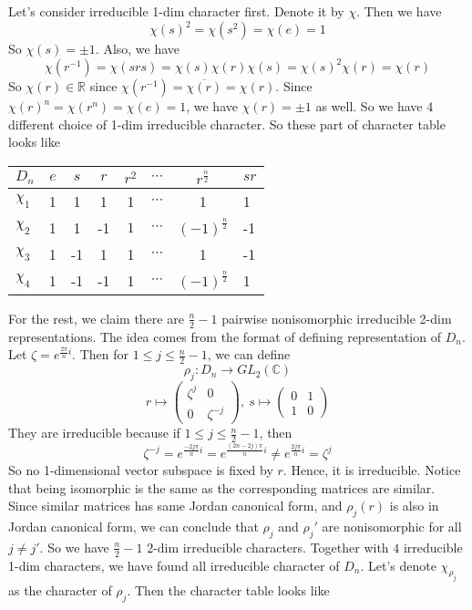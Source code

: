 \documentclass[12pt]{amsart}
\newcommand{\R}{\mathbb{R}}
\newcommand{\C}{\mathbb{C}}
\begin{document}
Let's consider irreducible 1-dim character first. Denote it by $\chi$. Then we have
\[\chi(s)^2=\chi(s^2)=\chi(e)=1\]
So $\chi(s)=\pm 1$. Also, we have
\[\chi(r^{-1})=\chi(srs)=\chi(s)\chi(r)\chi(s)=\chi(s)^2\chi(r)=\chi(r)\]
So $\chi(r)\in\R$ since $\chi(r^{-1})=\overline{\chi(r)}=\chi(r)$. Since $\chi(r)^n=\chi(r^n)=\chi(e)=1$, we have $\chi(r)=\pm 1$ as well. So we have 4 different choice of 1-dim irreducible character. So these part of character table looks like
\begin{table}[H]
    \centering
    \begin{tabular}{l|ccccccl}
        $D_n$    & $e$ & $s$ & $r$ & $r^2$ & $\cdots$ & $r^\frac{n}{2}$    & $sr$ \\ \hline
        $\chi_1$ & 1   & 1   & 1   & 1     & $\cdots$ & 1                  & 1    \\
        $\chi_2$ & 1   & 1   & -1  & $1$   & $\cdots$ & $(-1)^\frac{n}{2}$ & -1   \\
        $\chi_3$ & 1   & -1  & 1   & 1     & $\cdots$ & 1                  & -1   \\
        $\chi_4$ & 1   & -1  & -1  & 1     & $\cdots$ & $(-1)^\frac{n}{2}$ & 1
    \end{tabular}
\end{table}
\noindent For the rest, we claim there are $\frac{n}{2}-1$ pairwise nonisomorphic irreducible 2-dim representations. The idea comes from the format of defining representation of $D_n$.
Let $\zeta=e^{\frac{2\pi }{n}i}$. Then for $1\leq j \leq \frac{n}{2}-1$, we can define
$$\rho_j:D_n\to GL_2(\C)$$
\[r\mapsto\begin{pmatrix}
        \zeta^j & 0          \\
        0       & \zeta^{-j}
    \end{pmatrix},\ s\mapsto \begin{pmatrix}
        0 & 1 \\
        1 & 0
    \end{pmatrix}\]
They are irreducible because if $1\leq j\leq \frac{n}{2}-1$, then
\[\zeta^{-j}=e^{\frac{-2j\pi}{n}i}=e^{\frac{(2n-2j)\pi}{n}i}\neq e^{\frac{2j\pi}{n}i}=\zeta^j\]
So no 1-dimensional vector subspace is fixed by $r$. Hence, it is irreducible. Notice that being isomorphic is the same as the corresponding matrices are similar. Since similar matrices has same Jordan canonical form, and $\rho_j(r)$ is also in Jordan canonical form, we can conclude that $\rho_j$ and $\rho_j'$ are nonisomorphic for all $j\neq j'$. So we have $\frac{n}{2}-1$ 2-dim irreducible characters. Together with $4$ irreducible 1-dim characters, we have found all irreducible character of $D_n$. Let's denote $\chi_{\rho_j}$ as the character of $\rho_j$. Then the character table looks like
\end{document}
